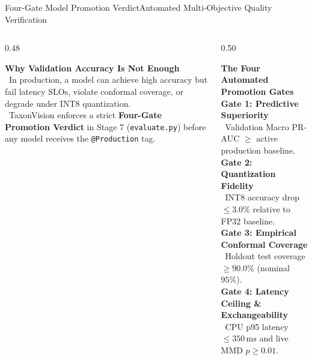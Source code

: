 \documentclass[aspectratio=169,10pt]{beamer}
\begin{document}
\begin{frame}{Four-Gate Model Promotion Verdict}{Automated Multi-Objective Quality Verification}
    \begin{columns}[T]
        \begin{column}{0.48\textwidth}
            \begin{rosecard}
                \textbf{\color{RoseAccent} Why Validation Accuracy Is Not Enough}\\[3pt]
                \textbullet\ In production, a model can achieve high accuracy but fail latency SLOs, violate conformal coverage, or degrade under INT8 quantization.\\[3pt]
                \textbullet\ TaxonVision enforces a strict \textbf{Four-Gate Promotion Verdict} in Stage 7 (\texttt{evaluate.py}) before any model receives the \texttt{@Production} tag.
            \end{rosecard}
        \end{column}
        \begin{column}{0.50\textwidth}
            \begin{card}
                \textbf{\color{SlateDark} The Four Automated Promotion Gates}\\[2pt]
                \textbf{Gate 1: Predictive Superiority}\\
                \textbullet\ Validation Macro PR-AUC $\ge$ active production baseline.\\[2pt]
                \textbf{Gate 2: Quantization Fidelity}\\
                \textbullet\ INT8 accuracy drop $\le 3.0\%$ relative to FP32 baseline.\\[2pt]
                \textbf{Gate 3: Empirical Conformal Coverage}\\
                \textbullet\ Holdout test coverage $\ge 90.0\%$ (nominal $95\%$).\\[2pt]
                \textbf{Gate 4: Latency Ceiling \& Exchangeability}\\
                \textbullet\ CPU p95 latency $\le 350\,\text{ms}$ and live MMD $p \ge 0.01$.
            \end{card}
        \end{column}
    \end{columns}
\end{frame}
\end{document}
